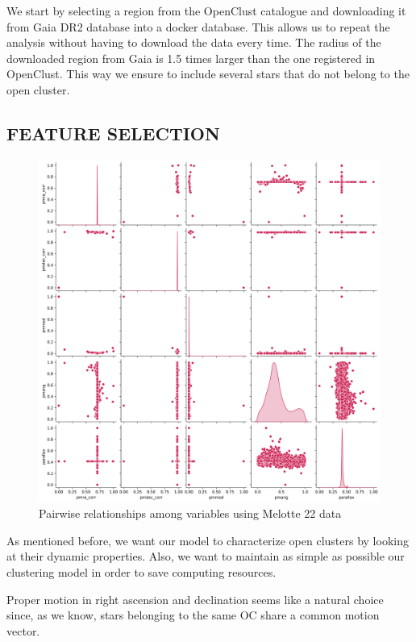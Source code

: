 \documentclass[11pt,a4paper,english,twocolumn]{article}
\begin{document}
We start by selecting a region from the OpenClust catalogue and downloading it from
Gaia DR2 database into a docker database. This allows us to repeat the analysis without
having to download the data every time. The radius of the downloaded region from Gaia
is 1.5 times larger than the one registered in OpenClust. This way we ensure to include
several stars that do not belong to the open cluster.

\subsection{FEATURE SELECTION}
\label{sec:feature_selection}

\begin{figure}[htbp]
  \includegraphics[width=\columnwidth]{../figures/melotte_22/features_melotte_22.png}
  \caption{Pairwise relationships among variables using Melotte 22 data}
  \label{fig:features_melotte_22}
\end{figure}

As mentioned before, we want our model to characterize open clusters by looking at
their dynamic properties. Also, we want to maintain as simple as possible our
clustering model in order to save computing resources.

Proper motion in right ascension and declination seems like a natural choice since,
as we know, stars belonging to the same OC share a common motion vector.
\end{document}
